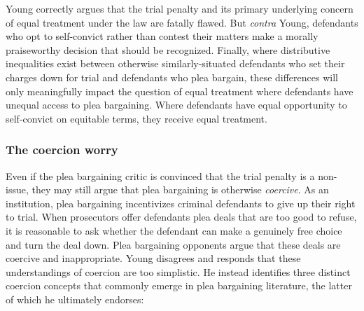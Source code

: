Young correctly argues that the trial penalty and its primary underlying concern of equal treatment under the law are fatally flawed. But \textit{contra} Young, defendants who opt to self-convict rather than contest their matters make a morally praiseworthy decision that should be recognized. Finally, where distributive inequalities exist between otherwise similarly-situated defendants who set their charges down for trial and defendants who plea bargain, these differences will only meaningfully impact the question of equal treatment where defendants have unequal access to plea bargaining. Where defendants have equal opportunity to self-convict on equitable terms, they receive equal treatment.

\subsubsection{The coercion worry}

Even if the plea bargaining critic is convinced that the trial penalty is a non-issue, they may still argue that plea bargaining is otherwise \textit{coercive}. As an institution, plea bargaining incentivizes criminal defendants to give up their right to trial. When prosecutors offer defendants plea deals that are too good to refuse, it is reasonable to ask whether the defendant can make a genuinely free choice and turn the deal down. Plea bargaining opponents argue that these deals are coercive and inappropriate. Young disagrees and responds that these understandings of coercion are too simplistic. He instead identifies three distinct coercion concepts that commonly emerge in plea bargaining literature, the latter of which he ultimately endorses:

